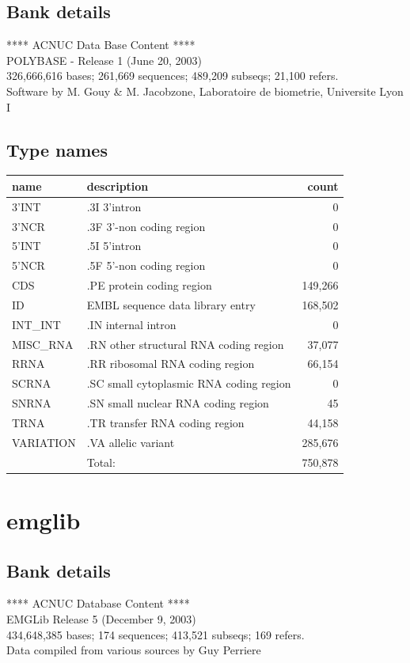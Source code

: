 \documentclass{article}
\begin{document}
\begin{Schunk}
\subsection{Bank details}
             ****     ACNUC Data Base Content      ****                         \\
                 POLYBASE - Release 1  (June 20, 2003)\\
326,666,616 bases; 261,669 sequences; 489,209 subseqs; 21,100 refers.\\
Software by M. Gouy \& M. Jacobzone, Laboratoire de biometrie, Universite Lyon I 

\subsection{Type names}
\noindent\begin{tabular}{llr}
\hline \hline
name & description & count \\
\hline
3'INT  &  .3I 3'intron  &  0 \\
3'NCR  &  .3F  3'-non coding region  &  0 \\
5'INT  &  .5I 5'intron  &  0 \\
5'NCR  &  .5F  5'-non coding region  &  0 \\
CDS  &  .PE protein coding region  &  149,266 \\
ID  &  EMBL sequence data library entry  &  168,502 \\
INT\_INT  &  .IN  internal intron  &  0 \\
MISC\_RNA  &  .RN other structural RNA coding region  &  37,077 \\
RRNA  &  .RR ribosomal RNA coding region  &  66,154 \\
SCRNA  &  .SC small cytoplasmic RNA coding region  &  0 \\
SNRNA  &  .SN small nuclear RNA coding region  &  45 \\
TRNA  &  .TR transfer RNA coding region  &  44,158 \\
VARIATION  &  .VA allelic variant  &  285,676 \\
\hline
 & Total: & 750,878 \\
\hline \hline
\end{tabular}

\section{ emglib }
\subsection{Bank details}
               ****     ACNUC Database Content      ****\\
                  EMGLib Release 5 (December 9, 2003)\\
434,648,385 bases; 174 sequences; 413,521 subseqs; 169 refers.\\
           Data compiled from various sources by Guy Perriere


\end{Schunk}
\end{document}
